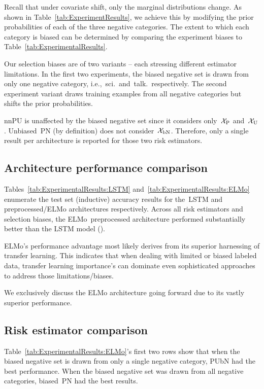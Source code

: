 Recall that under covariate shift, only the marginal distributions change.  As shown in Table~\eqref{tab:ExperimentResults}, we achieve this by modifying the prior probabilities of each of the three negative categories.  The extent to which each category is biased can be determined by comparing the experiment biases to Table~\ref{tab:ExperimentalResults}.

Our selection biases are of two variants -- each stressing different estimator limitations.  In the first two experiments, the biased negative set is drawn from only one negative category, i.e.,~sci.\ and~talk.\ respectively.  The second experiment variant draws training examples from all negative categories but shifts the prior probabilities.

nnPU is unaffected by the biased negative set since it considers only~$\mathcal{X}_{\textnormal{P}}$ and~$\mathcal{X}_{\textnormal{U}}$.  Unbiased~PN (by definition) does not consider~$\mathcal{X}_{\textnormal{bN}}$.  Therefore, only a single result per architecture is reported for those two risk estimators.

\subsection{Architecture performance comparison}

Tables~\ref{tab:ExperimentalResults:LSTM} and~\ref{tab:ExperimentalResults:ELMo} enumerate the test set (inductive) accuracy results for the~LSTM and preprocessed\-/ELMo architectures respectively.  Across all risk estimators and selection biases, the ELMo~preprocessed architecture performed substantially better than the LSTM model ().

ELMo's performance advantage most likely derives from its superior harnessing of transfer learning.  This indicates that when dealing with limited or biased labeled data, transfer learning importance's can dominate even sophisticated approaches to address those limitations/biases.

We exclusively discuss the ELMo architecture going forward due to its vastly superior performance.

\subsection{Risk estimator comparison}

Table~\ref{tab:ExperimentalResults:ELMo}'s first two rows show that when the biased negative set is drawn from only a single negative category, PUbN had the best performance.  When the biased negative set was drawn from all negative categories, biased~PN had the best results.

